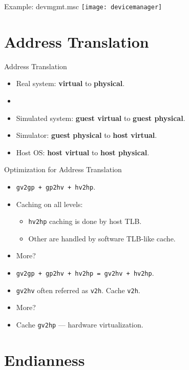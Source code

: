 \begin{frame}{Example: devmgmt.msc}
\centering
\texttt{[image: devicemanager]}
\end{frame}

\section{Address Translation}

\begin{frame}{Address Translation}
\begin{itemize}
\item Real system: \textbf{virtual} to \textbf{physical}.
\item[] \pause
\item Simulated system: \textbf{guest virtual} to \textbf{guest physical}.\pause
\item Simulator: \textbf{guest physical} to \textbf{host virtual}.\pause
\item Host OS: \textbf{host virtual} to \textbf{host physical}.
\end{itemize}
\end{frame}

\begin{frame}{Optimization for Address Translation}
\begin{itemize}
\item \texttt{gv2gp + gp2hv + hv2hp}.\pause
\item Caching on all levels:
\begin{itemize}
\item \texttt{hv2hp} caching is done by host TLB.
\item Other are handled by software TLB-like cache.\pause
\end{itemize}
\item More?\pause
\item \texttt{gv2gp + gp2hv + hv2hp = gv2hv + hv2hp}.
\item \texttt{gv2hv} often referred as \texttt{v2h}. Cache \texttt{v2h}.\pause
\item More?\pause
\item Cache \texttt{gv2hp} --- hardware virtualization.
\end{itemize}
\end{frame}

\section{Endianness}

